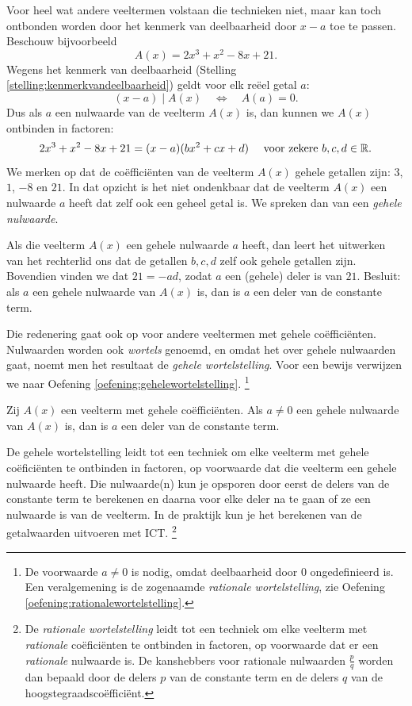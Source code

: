 \documentclass{ximera}
\begin{document}
Voor heel wat andere veeltermen volstaan die technieken niet, maar kan toch ontbonden worden door het kenmerk van deelbaarheid door $x-a$ toe te passen. Beschouw bijvoorbeeld
\[
A(x) = 2x^3 +x^2 - 8x + 21.
\]
Wegens het kenmerk van deelbaarheid (Stelling \ref{stelling:kenmerkvandeelbaarheid}) geldt voor elk re\"eel getal $a$: 
\[
(x-a) \mid A(x) \quad \Leftrightarrow \quad A(a) = 0. 
\]
Dus als $a$ een nulwaarde van de veelterm $A(x)$ is, dan kunnen we $A(x)$ ontbinden in factoren:
\[
2x^3 +x^2 - 8x + 21 = (x-a)(bx^2 + cx + d) %
\quad 
\text{ voor zekere } b,c,d \in \R.
\]
We merken op dat de co\"effici\"enten van de veelterm $A(x)$ gehele getallen zijn: $3$, $1$, $-8$ en $21$. In dat opzicht is het niet ondenkbaar dat de veelterm $A(x)$ een nulwaarde $a$ heeft dat zelf ook een geheel getal is. We spreken dan van een {\em gehele nulwaarde}.

Als die veelterm $A(x)$ een gehele nulwaarde $a$ heeft, dan leert het uitwerken van het rechterlid ons dat de getallen $b,c,d$ zelf ook gehele getallen zijn. Bovendien vinden we dat $21 = -ad$, zodat $a$ een (gehele) deler is van $21$. Besluit: als $a$ een gehele nulwaarde van $A(x)$ is, dan is $a$ een deler van de constante term. 

Die redenering gaat ook op voor andere veeltermen met gehele co\"effici\"enten. Nulwaarden worden ook {\em wortels} genoemd, en omdat het over gehele nulwaarden gaat, noemt men het resultaat de {\em gehele wortelstelling}. Voor een bewijs verwijzen we naar Oefening \ref{oefening:gehelewortelstelling}.
\footnote{De voorwaarde $a \neq 0$ is nodig, omdat deelbaarheid door $0$ ongedefinieerd is.
Een veralgemening is de zogenaamde {\em rationale wortelstelling}, zie Oefening \ref{oefening:rationalewortelstelling}.}

\begin{stelling} \label{stelling:gehelewortelstelling}
Zij $A(x)$ een veelterm met gehele co\"effici\"enten. Als $a \neq 0$ een gehele nulwaarde van $A(x)$ is, dan is $a$ een deler van de constante term. 
\end{stelling}

\clearpage

De gehele wortelstelling leidt tot een techniek om elke veelterm met gehele co\"efici\"enten te ontbinden in factoren, op voorwaarde dat die veelterm een gehele nulwaarde heeft. Die nulwaarde(n) kun je opsporen door eerst de delers van de constante term te berekenen en daarna voor elke deler na te gaan of ze een nulwaarde is van de veelterm. In de praktijk kun je het berekenen van de getalwaarden uitvoeren met ICT. \footnote{De {\em rationale wortelstelling} leidt tot een techniek om elke veelterm met {\em rationale} co\"efici\"enten 
te ontbinden in factoren, op voorwaarde dat er een {\em rationale} nulwaarde is. De kanshebbers voor rationale nulwaarden $\frac{p}{q}$ worden dan bepaald door de delers $p$ van de constante term en de delers $q$ van de hoogstegraadsco\"effici\"ent.}
\end{document}
